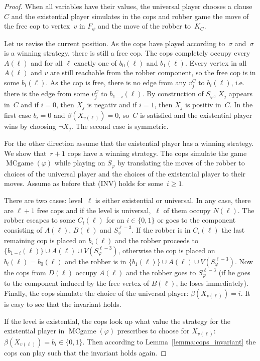 \documentclass[authoryear]{article}
\makeatletter
\theoremstyle{definition}
\renewcommand{\phi}{\varphi}
\newcommand{\0}{\emptyset}
\DeclareMathOperator{\MCGAME}{MCgame}
\newcommand{\ie}{i.e.\@\xspace}
\makeatother
\begin{document}
\begin{proof}
When all variables have their values, the universal player chooses a
clause~$C$ and the existential player simulates in the cops and robber
game the move of the free cop to vertex~$v$ in $F_\psi$ and the move
of the robber to~$K_C$. 

Let us revise the current position. As the cops have played according to~$\sigma$
and~$\sigma$ is a winning strategy, there is still a free cop. The cops completely 
occupy every $A(\ell)$ and for all
$\ell$ exactly one of $b_0(\ell)$ and $b_1(\ell)$. Every vertex in all
$A(\ell)$ and $v$ are still reachable from the robber component, so the free cop
is in some $b_i(\ell)$. As the cop is free, there is no edge from any
$v_j^C$ to $b_i(\ell)$, \ie there is the edge from some $v_j^C$ to
$b_{1-i}(\ell)$. By construction of $S_\phi$, $X_j$ appears
in~$C$ and if $i=0$, then $X_j$ is negativ and if $i=1$, then
$X_j$ is positiv in~$C$. In the first case $b_i = 0$ and
$\beta(X_{v(\ell)}) = 0$, so~$C$ is satisfied and the existential
player wins by choosing $\neg X_j$. The second case is
symmetric.

For the other direction assume that the existential player has a winning 
strategy. We show that~$r+1$ cops have a winning strategy. The cops simulate 
the game $\MCGAME(\phi)$ while playing on $S_\phi$ by translating the moves of 
the 
robber to choices of the universal player and the choices of the existential 
player to their moves. Assume as before that (INV) holds for
some~$i\ge 1$.

There are two cases: level~$\ell$ is either existential or universal. In any
case, there are $\ell + 1$ free cops and if the level is universal,~$\ell$ of
them occupy $N(\ell)$. The robber escapes to some $C_i(\ell)$ for an
$i\in \{0,1\}$ or goes to the component consisting of $A(\ell)$, $B(\ell)$ and
$S_\phi^{\ell-3}$. If the robber is in $C_i(\ell)$ the last remaining cop is
placed on $b_i(\ell)$ and the robber proceeds to
$\{b_{1-i}(\ell)\}\cup A(\ell) \cup V(S_\phi^{\ell-3})$, otherwise the cop is
placed on $b_i(\ell) = b_0(\ell)$ and the robber is in
$\{b_1(\ell)\}\cup A(\ell) \cup V(S_\phi^{\ell-3})$. Now the cops from $D(\ell)$
occupy $A(\ell)$ and the robber goes to $S_\phi^{\ell-3}$ (if he goes to the
component induced by the free vertex of $B(\ell)$, he loses
immediately). Finally, the cops simulate the choice of the universal player:
$\beta(X_{v(\ell)}) = i$. It is easy to see that the invariant holds.

If the level is existential, the cops look up what value the strategy for the 
existential player in $\MCGAME(\phi)$ prescribes to choose for 
$X_{v(\ell)}$: $\beta(X_{v(\ell)}) = b_i \in \{0,1\}$. Then according to 
Lemma~\ref{lemma:cops_invariant} the cops can play such that the invariant 
holds again.


\end{proof}
\end{document}
